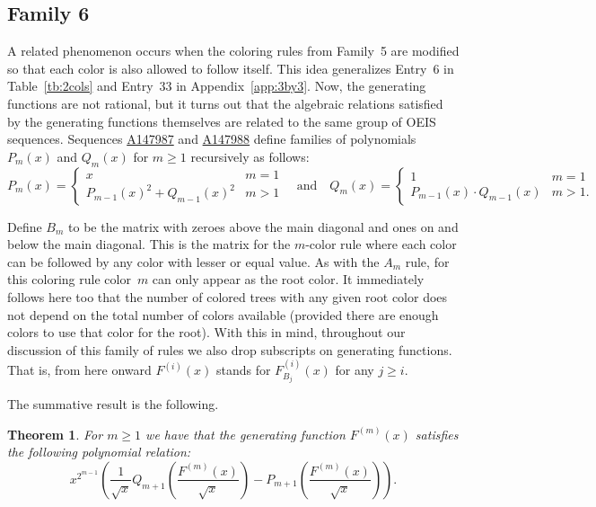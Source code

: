 \documentclass[12pt]{amsart}
\newtheorem{theorem}{Theorem}
\newcommand{\seqnum}[1]{\href{https://oeis.org/#1}{#1}}
\newcommand{\gff}[2]{F_{#2}^{(#1)}(x)}
\newcommand{\gfnoa}[1]{F^{(#1)}(x)}
\begin{document}
\subsection{Family 6}

A related phenomenon occurs when the coloring rules from Family~5 are modified so that each color is also allowed to follow itself. This idea generalizes Entry~6 in Table~\ref{tb:2cols} and Entry~33 in Appendix~\ref{app:3by3}. Now, the generating functions are not rational, but it turns out that the algebraic relations satisfied by the generating functions themselves are related to the same group of OEIS sequences. Sequences \seqnum{A147987} and \seqnum{A147988} define families of polynomials $P_m(x)$ and $Q_m(x)$ for $m\geq1$ recursively as follows:
\[
    P_m(x)=\begin{cases}
        x & m = 1\\
        P_{m-1}(x)^2+Q_{m-1}(x)^2 & m>1
    \end{cases}
    \quad \text{and} \quad
    Q_m(x)=\begin{cases}
        1 & m = 1\\
        P_{m-1}(x)\cdot Q_{m-1}(x) & m>1.
    \end{cases}
    \]

Define $B_m$ to be the matrix with zeroes above the main diagonal and ones on and below the main diagonal. This is the matrix for the $m$-color rule where each color can be followed by any color with lesser or equal value. As with the $A_m$ rule, for this coloring rule color~$m$ can only appear as the root color. It immediately follows here too that the number of colored trees with any given root color does not depend on the total number of colors available (provided there are enough colors to use that color for the root). With this in mind, throughout our discussion of this family of rules we also drop subscripts on generating functions. That is, from here onward $\gfnoa{i}$ stands for $\gff{i}{B_j}$ for any $j\geq i$.

The summative result is the following.
\begin{theorem}\label{thm:gen33}   
    For $m\geq1$ we have that the generating function $\gfnoa{m}$ satisfies the following polynomial relation:
    \[
    x^{2^{m-1}}\left(\frac{1}{\sqrt{x}}Q_{m+1}\!\left(\frac{\gfnoa{m}}{\sqrt{x}}\right)-P_{m+1}\!\left(\frac{\gfnoa{m}}{\sqrt{x}}\right)\right).
    \]
\end{theorem}
\end{document}

